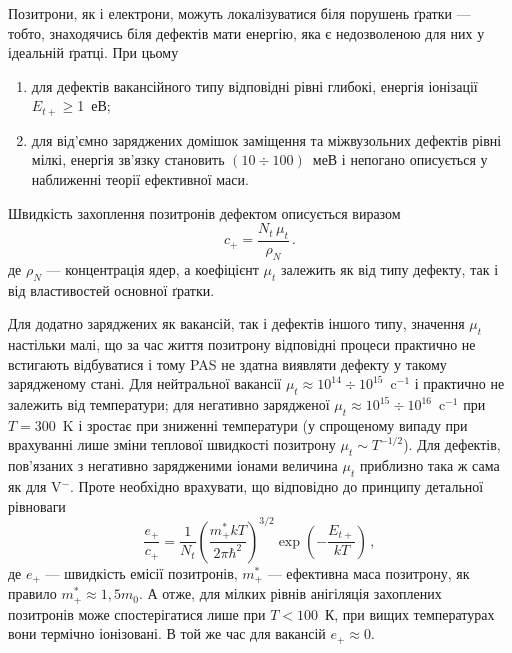 \documentclass[10pt,a5paper,titlepage,oneside]{book}
\numberwithin{equation}{part}
\begin{document}
Позитрони, як і електрони, можуть локалізуватися біля порушень ґратки --- тобто, знаходячись біля дефектів мати енергію,
яка є недозволеною для них у ідеальній ґратці.
При цьому
\begin{enumerate}[label=\asbuk*),leftmargin=0em,itemindent=1.5em]
\item для дефектів вакансійного типу відповідні рівні глибокі, енергія іонізації $E_{t+}\geq$1~еВ;
\item для від'ємно заряджених домішок заміщення та міжвузольних дефектів рівні мілкі,
 енергія зв'язку становить $(10\div100)$~меВ і
непогано описується у наближенні теорії ефективної маси.
\end{enumerate}

Швидкість захоплення позитронів дефектом описується виразом
\begin{equation}\label{PASc}
c_+=\frac{N_t\,\mu_t}{\rho_N}\,.
\end{equation}
де
$\rho_N$ --- концентрація ядер,
а коефіцієнт $\mu_t$ залежить як від типу дефекту, так і від властивостей основної ґратки.

Для додатно заряджених як вакансій, так і дефектів іншого типу, значення $\mu_t$
настільки малі, що за час життя позитрону відповідні процеси практично не встигають відбуватися і тому
PAS не здатна виявляти дефекту у такому зарядженому стані.
Для нейтральної вакансії $\mu_t\approx10^{14}\div10^{15}$~c$^{-1}$ і практично не залежить від температури;
для негативно зарядженої $\mu_t\approx10^{15}\div10^{16}$~c$^{-1}$ при $T=300$~K і зростає при
зниженні температури (у спрощеному випаду при врахуванні лише зміни теплової швидкості
позитрону $\mu_t\sim T^{-1/2}$).
Для дефектів, пов'язаних з негативно зарядженими іонами величина $\mu_t$ приблизно така ж сама
як для V$^-$.
Проте необхідно врахувати, що відповідно до принципу детальної рівноваги
\begin{equation}\label{PASce}
\frac{e_+}{c_+}=\frac{1}{N_t}\left(\frac{m_+^*kT}{2\pi\hbar^2}\right)^{3/2}\exp\left(-\frac{E_{t+}}{kT}\right)\,,
\end{equation}
де
$e_+$ --- швидкість емісії позитронів,
$m_+^*$ --- ефективна маса позитрону, як правило $m_+^*\approx1,5 m_0$.
А отже, для мілких рівнів анігіляція захоплених позитронів може спостерігатися лише при
$T<100$~К, при вищих температурах вони термічно іонізовані.
В той же час для вакансій $e_+\approx0$.
\end{document}
